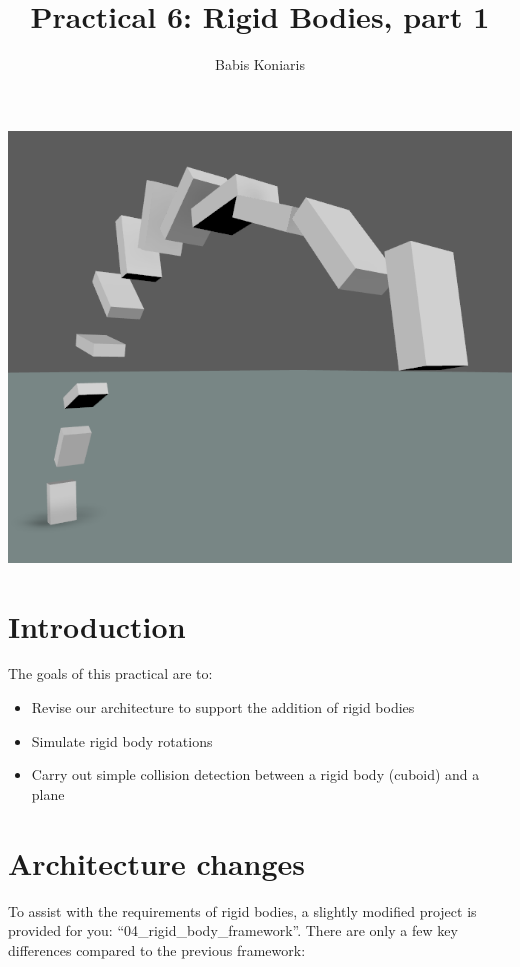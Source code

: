 \documentclass[12pt]{article}
\title{\textbf{Practical 6: Rigid Bodies, part 1 }}
\author{Babis Koniaris}
\date{}
\begin{document}
\maketitle

\begin{center}
\includegraphics[width=\textwidth]{p6-teaser.png}
\end{center}
\pagebreak

\section*{Introduction}

The goals of this practical are to:

\begin{itemize}
\item Revise our architecture to support the addition of rigid bodies
\item Simulate rigid body rotations
\item Carry out simple collision detection between a rigid body (cuboid) and a plane
\end{itemize}

\section*{Architecture changes}

To assist with the requirements of rigid bodies, a slightly modified project is provided for you: ``04\_rigid\_body\_framework''. There are only a few key differences compared to the previous framework:
\end{document}
